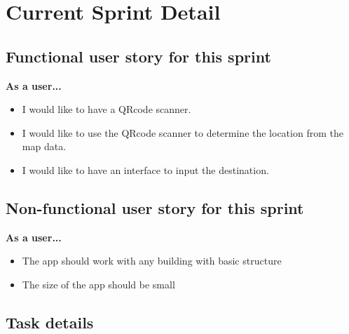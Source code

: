 \documentclass[12pt]{article}
\begin{document}
\section{Current Sprint Detail}

\subsection{Functional user story for this sprint}

\textbf{As a user...}
\begin{itemize}
\item I would like to have a QR­code scanner.
\item I would like to use the QR­code scanner to determine the location from the map data.
\item I would like to have an interface to input the destination.
\end{itemize}

\subsection{Non-functional user story for this sprint}

\textbf{As a user...}
\begin{itemize}

\item The app should work with any building with basic structure 
\item The size of the app should be small
\end{itemize}


\subsection{Task details}



\end{document}
